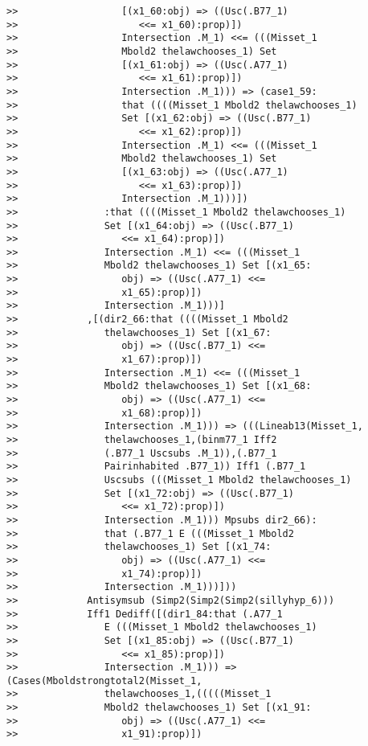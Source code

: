 \documentclass[12pt]{article}
\begin{document}
\begin{verbatim}
>>                  [(x1_60:obj) => ((Usc(.B77_1)
>>                     <<= x1_60):prop)])
>>                  Intersection .M_1) <<= (((Misset_1
>>                  Mbold2 thelawchooses_1) Set
>>                  [(x1_61:obj) => ((Usc(.A77_1)
>>                     <<= x1_61):prop)])
>>                  Intersection .M_1))) => (case1_59:
>>                  that ((((Misset_1 Mbold2 thelawchooses_1)
>>                  Set [(x1_62:obj) => ((Usc(.B77_1)
>>                     <<= x1_62):prop)])
>>                  Intersection .M_1) <<= (((Misset_1
>>                  Mbold2 thelawchooses_1) Set
>>                  [(x1_63:obj) => ((Usc(.A77_1)
>>                     <<= x1_63):prop)])
>>                  Intersection .M_1)))])
>>               :that ((((Misset_1 Mbold2 thelawchooses_1)
>>               Set [(x1_64:obj) => ((Usc(.B77_1)
>>                  <<= x1_64):prop)])
>>               Intersection .M_1) <<= (((Misset_1
>>               Mbold2 thelawchooses_1) Set [(x1_65:
>>                  obj) => ((Usc(.A77_1) <<=
>>                  x1_65):prop)])
>>               Intersection .M_1)))]
>>            ,[(dir2_66:that ((((Misset_1 Mbold2
>>               thelawchooses_1) Set [(x1_67:
>>                  obj) => ((Usc(.B77_1) <<=
>>                  x1_67):prop)])
>>               Intersection .M_1) <<= (((Misset_1
>>               Mbold2 thelawchooses_1) Set [(x1_68:
>>                  obj) => ((Usc(.A77_1) <<=
>>                  x1_68):prop)])
>>               Intersection .M_1))) => (((Lineab13(Misset_1,
>>               thelawchooses_1,(binm77_1 Iff2
>>               (.B77_1 Uscsubs .M_1)),(.B77_1
>>               Pairinhabited .B77_1)) Iff1 (.B77_1
>>               Uscsubs (((Misset_1 Mbold2 thelawchooses_1)
>>               Set [(x1_72:obj) => ((Usc(.B77_1)
>>                  <<= x1_72):prop)])
>>               Intersection .M_1))) Mpsubs dir2_66):
>>               that (.B77_1 E (((Misset_1 Mbold2
>>               thelawchooses_1) Set [(x1_74:
>>                  obj) => ((Usc(.A77_1) <<=
>>                  x1_74):prop)])
>>               Intersection .M_1)))]))
>>            Antisymsub (Simp2(Simp2(Simp2(sillyhyp_6)))
>>            Iff1 Dediff([(dir1_84:that (.A77_1
>>               E (((Misset_1 Mbold2 thelawchooses_1)
>>               Set [(x1_85:obj) => ((Usc(.B77_1)
>>                  <<= x1_85):prop)])
>>               Intersection .M_1))) => (Cases(Mboldstrongtotal2(Misset_1,
>>               thelawchooses_1,(((((Misset_1
>>               Mbold2 thelawchooses_1) Set [(x1_91:
>>                  obj) => ((Usc(.A77_1) <<=
>>                  x1_91):prop)])

\end{verbatim}
\end{document}

